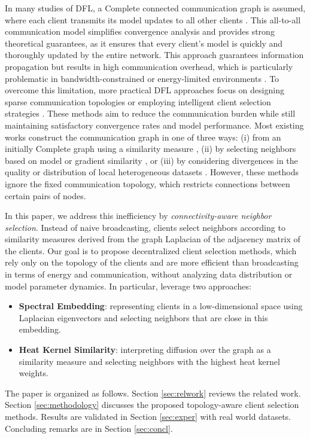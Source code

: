 \documentclass[journal]{IEEEtran}
\begin{document}
In many studies of DFL, a Complete connected communication graph is assumed, where each client transmits its model updates to all other clients \cite{DSGD, healthcare, decOPT, iot}. This all-to-all communication model simplifies convergence analysis and provides strong theoretical guarantees, as it ensures that every client's model is quickly and thoroughly updated by the entire network. This approach guarantees information propagation but results in high communication overhead, which is particularly problematic in bandwidth-constrained or energy-limited environments \cite{decOPT}. To overcome this limitation, more practical DFL approaches focus on designing sparse communication topologies or employing intelligent client selection strategies \cite{graph_select1}. These methods aim to reduce the communication burden while still maintaining satisfactory convergence rates and model performance. Most existing works construct the communication graph in one of three ways: (i) from an initially Complete graph using a similarity measure \cite{smart_samp, select_data_2}, (ii) by selecting neighbors based on model or gradient similarity \cite{select_grad_1}, or (iii) by considering divergences in the quality or distribution of local heterogeneous datasets \cite{select_data_2}. However, these methods ignore the fixed communication topology, which restricts connections between certain pairs of nodes.

In this paper, we address this inefficiency by \textit{connectivity-aware neighbor selection}. Instead of naive broadcasting, clients select neighbors according to similarity measures derived from the graph Laplacian of the adjacency matrix of the clients. Our goal is to propose decentralized client selection methods, which rely only on the topology of the clients and are more efficient than broadcasting in terms of energy and communication, without analyzing data distribution or model parameter dynamics. In particular, leverage two approaches:

\begin{itemize} 
    \item \textbf{Spectral Embedding}: representing clients in a low-dimensional space using Laplacian eigenvectors and selecting neighbors that are close in this embedding. 
    \item \textbf{Heat Kernel Similarity}: interpreting diffusion over the graph as a similarity measure and selecting neighbors with the highest heat kernel weights. 
\end{itemize}
The paper is organized as follows. Section \ref{sec:relwork} reviews the related work. Section \ref{sec:methodology} discusses the proposed topology-aware client selection methods. Results are validated in Section \ref{sec:exper} with real world datasets. Concluding remarks are in Section \ref{sec:concl}.
 
\end{document}

